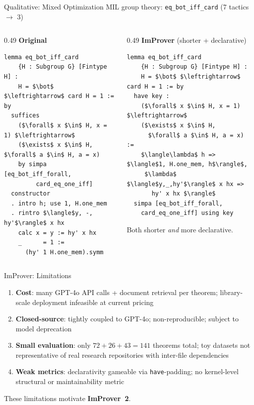 \begin{frame}[fragile]{Qualitative: Mixed Optimization}
\vspace{0.3em}
{\small MIL group theory: \texttt{eq\_bot\_iff\_card} (7 tactics $\to$ 3)}
\begin{columns}[T]
\begin{column}{0.49\textwidth}
\textbf{Original}
\begin{lstlisting}[basicstyle=\tiny\ttfamily]
lemma eq_bot_iff_card
    {H : Subgroup G} [Fintype H] :
    H = $\bot$ $\leftrightarrow$ card H = 1 := by
  suffices
    ($\forall$ x $\in$ H, x = 1) $\leftrightarrow$
    ($\exists$ x $\in$ H, $\forall$ a $\in$ H, a = x)
    by simpa [eq_bot_iff_forall,
         card_eq_one_iff]
  constructor
  . intro h; use 1, H.one_mem
  . rintro $\langle$y, -, hy'$\rangle$ x hx
    calc x = y := hy' x hx
    _      = 1 :=
      (hy' 1 H.one_mem).symm
\end{lstlisting}
\end{column}
\begin{column}{0.49\textwidth}
\textbf{ImProver} (shorter + declarative)
\begin{lstlisting}[basicstyle=\tiny\ttfamily]
lemma eq_bot_iff_card
    {H : Subgroup G} [Fintype H] :
    H = $\bot$ $\leftrightarrow$ card H = 1 := by
  have key :
    ($\forall$ x $\in$ H, x = 1) $\leftrightarrow$
    ($\exists$ x $\in$ H,
      $\forall$ a $\in$ H, a = x) :=
    $\langle\lambda$ h => $\langle$1, H.one_mem, h$\rangle$,
     $\lambda$ $\langle$y,_,hy'$\rangle$ x hx =>
       hy' x hx $\rangle$
  simpa [eq_bot_iff_forall,
    card_eq_one_iff] using key
\end{lstlisting}
\vspace{0.2em}
\small Both shorter \emph{and} more declarative.
\end{column}
\end{columns}
\end{frame}

\begin{frame}{ImProver: Limitations}
\vspace{0.3em}
\begin{enumerate}\setlength{\itemsep}{10pt}
  \item[\bad{1.}] \textbf{Cost}: many GPT-4o API calls + document retrieval per theorem; library-scale deployment infeasible at current pricing
  \item[\bad{2.}] \textbf{Closed-source}: tightly coupled to GPT-4o; non-reproducible; subject to model deprecation
  \item[\bad{3.}] \textbf{Small evaluation}: only $72 + 26 + 43 = 141$ theorems total; toy datasets not representative of real research repositories with inter-file dependencies
  \item[\bad{4.}] \textbf{Weak metrics}: declarativity gameable via \texttt{have}-padding; no kernel-level structural or maintainability metric
\end{enumerate}
\vspace{0.8em}
\begin{alertblock}{}
  \centering These limitations motivate \textbf{ImProver~2}.
\end{alertblock}
\end{frame}


